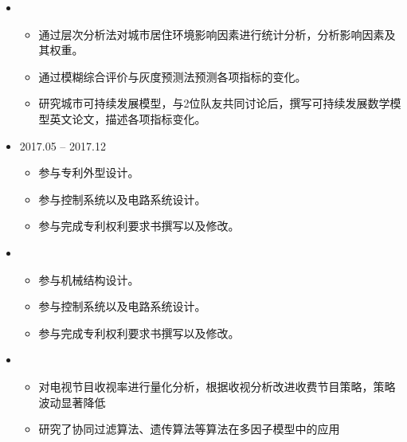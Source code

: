   \begin{itemize}[leftmargin=*]
    \item
      {\small
      \begin{itemize}
      \item 通过层次分析法对城市居住环境影响因素进行统计分析，分析影响因素及其权重。
        \item 通过模糊综合评价与灰度预测法预测各项指标的变化。
        \item 研究城市可持续发展模型，与2位队友共同讨论后，撰写可持续发展数学模型英文论文，描述各项指标变化。
      \end{itemize}
      }
    \item
       {2017.05 -- 2017.12}
      {\small
      \begin{itemize}
        \item 参与专利外型设计。
        \item 参与控制系统以及电路系统设计。
        \item 参与完成专利权利要求书撰写以及修改。
        
      \end{itemize}
      }
    \item
      {\small
      \begin{itemize}
       \item 参与机械结构设计。
       \item 参与控制系统以及电路系统设计。
       \item 参与完成专利权利要求书撰写以及修改。
      \end{itemize}
      }
    \item
      {\small
      \begin{itemize}
        \item 对电视节目收视率进行量化分析，根据收视分析改进收费节目策略，策略波动显著降低
        \item 研究了协同过滤算法、遗传算法等算法在多因子模型中的应用
      \end{itemize}
      }
  
  \end{itemize}